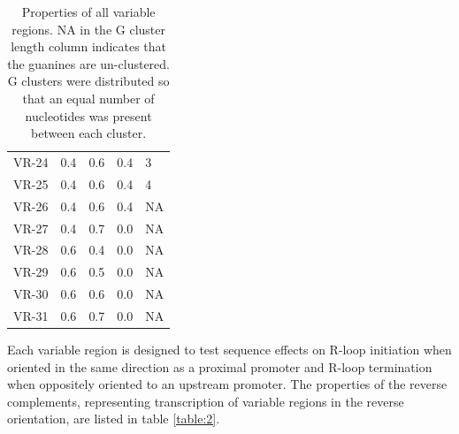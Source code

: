 \documentclass[11pt]{article}
\begin{document}
\begin{table}
\begin{tabular}{lrrrl}
	VR-24 &      0.4 &         0.6 &      0.4 &              3 \\
	VR-25 &      0.4 &         0.6 &      0.4 &              4 \\
	VR-26 &      0.4 &         0.6 &      0.4 &             NA \\
	VR-27 &      0.4 &         0.7 &      0.0 &             NA \\
	VR-28 &      0.6 &         0.4 &      0.0 &             NA \\
	VR-29 &      0.6 &         0.5 &      0.0 &             NA \\
	VR-30 &      0.6 &         0.6 &      0.0 &             NA \\
	VR-31 &      0.6 &         0.7 &      0.0 &             NA \\
	\bottomrule
\end{tabular}
\caption{Properties of all variable regions. NA in the G cluster length column indicates that the guanines are un-clustered. G clusters were distributed so that an equal number of nucleotides was present between each cluster.}
\label{table:1}
\end{table}


Each variable region is designed to test sequence effects on R-loop initiation when oriented in the same direction as a proximal promoter and R-loop termination when oppositely oriented to an upstream promoter. The properties of the reverse complements, representing transcription of variable regions in the reverse orientation, are listed in table \ref{table:2}. 
\end{document}
